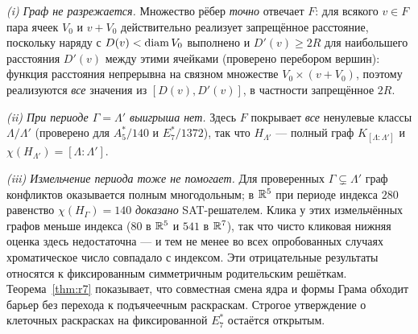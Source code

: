 \emph{(i) Граф не разрежается.} Множество рёбер \emph{точно} отвечает $F$:
для всякого $v\in F$ пара ячеек $V_0$ и $v+V_0$ действительно реализует
запрещённое расстояние, поскольку наряду с $D(v)<\operatorname{diam} V_0$ выполнено и
$D'(v)\ge2R$ для наибольшего расстояния $D'(v)$ между этими ячейками (проверено
перебором вершин): функция расстояния непрерывна на связном множестве
$V_0\times(v+V_0)$, поэтому реализуются \emph{все} значения из
$[D(v),D'(v)]$, в частности запрещённое $2R$.

\emph{(ii) При периоде $\Gamma=\Lambda'$ выигрыша нет.} Здесь $F$ покрывает
\emph{все} ненулевые классы $\Lambda/\Lambda'$ (проверено для $A_5^*/140$ и
$E_7^*/1372$), так что $H_{\Lambda'}$ --- полный граф
$K_{[\Lambda:\Lambda']}$ и $\chi(H_{\Lambda'})=[\Lambda:\Lambda']$.

\emph{(iii) Измельчение периода тоже не помогает.} Для проверенных
$\Gamma\subsetneq\Lambda'$ граф конфликтов оказывается полным многодольным; в
$\mathbb{R}^5$ при периоде индекса $280$ равенство $\chi(H_\Gamma)=140$ \emph{доказано}
SAT-решателем. Клика у этих измельчённых графов меньше индекса ($80$ в $\mathbb{R}^5$
и $541$ в $\mathbb{R}^7$), так что чисто кликовая нижняя оценка здесь недостаточна --- и
тем не менее во всех опробованных случаях хроматическое число совпадало с
индексом. Эти отрицательные результаты относятся к фиксированным
симметричным родительским решёткам. Теорема~\ref{thm:r7} показывает, что
совместная смена ядра и формы Грама обходит барьер без перехода к
подъячеечным раскраскам. Строгое утверждение о клеточных раскрасках на
фиксированной $E_7^*$ остаётся открытым.


